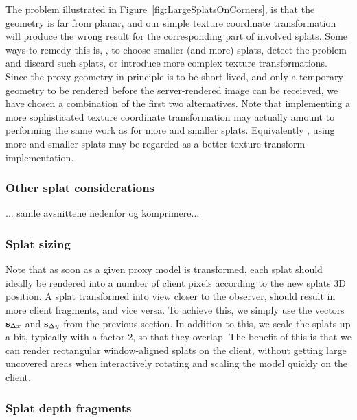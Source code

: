 The problem illustrated in Figure~\ref{fig:LargeSplatsOnCorners}, is that the
geometry is far from planar, and our simple texture coordinate transformation
will produce the wrong result for the corresponding part of involved
splats. Some ways to remedy this is, \eg, to choose smaller (and more) splats,
detect the problem and discard such splats, or introduce more complex texture
transformations. Since the proxy geometry in principle is to be short-lived, and
only a temporary geometry to be rendered before the server-rendered image can be
receieved, we have chosen a combination of the first two alternatives. Note that
implementing a more sophisticated texture coordinate transformation may actually
amount to performing the same work as for more and smaller splats. Equivalently
, using more and smaller splats may be regarded as a better texture transform
implementation.


\subsubsection{Other splat considerations}

{\color{red} ... samle avsnittene nedenfor og komprimere...}


\subsubsection{Splat sizing}

Note that as soon as a given proxy model is transformed, each splat should
ideally be rendered into a number of client pixels according to the new splats
3D position. A splat transformed into view closer to the observer, should result
in more client fragments, and vice versa. To achieve this, we simply use the
vectors $\mathbf{s}_{\Delta x}$ and $\mathbf{s}_{\Delta y}$ from the previous section.
In addition to this, we scale the splats up a bit, typically with a factor 2, so
that they overlap. The benefit of this is that we can render rectangular
window-aligned splats on the client, without getting large uncovered areas when
interactively rotating and scaling the model quickly on the client.


\subsubsection{Splat depth fragments}

